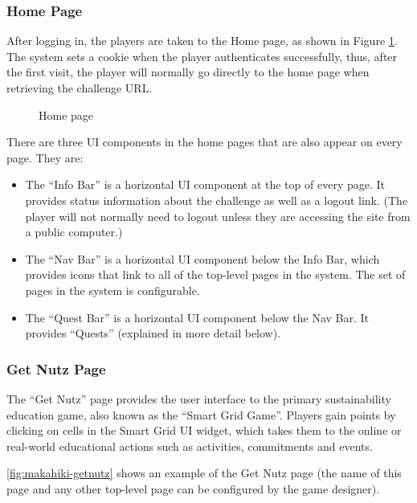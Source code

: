 \clearpage

\subsubsection{Home Page}
After logging in, the players are taken to the Home page, as shown in Figure \ref{fig:makahiki-home}. The system sets a cookie when the player authenticates successfully, thus, after the first visit, the player will normally go directly to the home page when retrieving the challenge URL.

\begin{figure}[!ht]
\begin{center}
\end{center}
\caption{Home page}
\label{fig:makahiki-home}
\end{figure}

There are three UI components in the home pages that are also appear on every page. They are:

\begin{itemize}
  \item The ``Info Bar'' is a horizontal UI component at the top of every page. It provides status information about the challenge as well as a logout link. (The player will not normally need to logout unless they are accessing the site from a public computer.)
  \item The ``Nav Bar'' is a horizontal UI component below the Info Bar, which provides icons that link to all of the top-level pages in the system. The set of pages in the system is configurable.
  \item The ``Quest Bar'' is a horizontal UI component below the Nav Bar. It provides ``Quests'' (explained in more detail below).
\end{itemize}

\clearpage

\subsubsection{Get Nutz Page}
The ``Get Nutz'' page provides the user interface to the primary sustainability education game, also known as the ``Smart Grid Game''. Players gain points by clicking on cells in the Smart Grid UI widget, which takes them to the online or real-world educational actions such as activities, commitments and events.

\autoref{fig:makahiki-getnutz} shows an example of the Get Nutz page (the name of this page and any other top-level page can be configured by the game designer).

